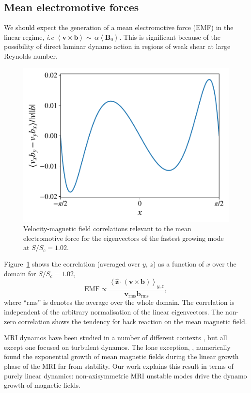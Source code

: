 \documentclass[openacc]{rsproca_new}%
\newcommand{\SSC}{S/S_{c}}
\begin{document}
\subsection{Mean electromotive forces}
\label{sec:emf}
We should expect the generation of a mean electromotive force (EMF) in the linear regime, \textit{i.e}
$\left<\boldsymbol{v}\times\boldsymbol{b}\right>\sim\,\alpha\!\left<\boldsymbol{B}_{0}\right>$.
This is significant because of the possibility of direct laminar dynamo action in regions of weak shear at large Reynolds number.
\begin{figure}[h!]
  \includegraphics[width=\columnwidth]{mean_field_alpha_run_11_output.pdf}
  \caption{Velocity-magnetic field correlations relevant to the mean electromotive force for the eigenvectors of the fastest growing mode at $\SSC = 1.02$.}
  \label{fig:correlation}
\end{figure}
Figure~\ref{fig:correlation} shows the correlation (averaged over $y,\,z$) as a function of $x$ over the domain for $\SSC = 1.02$,
\begin{equation}
\text{EMF}\propto\frac{\left<\boldsymbol{\hat{z}}\cdot(\boldsymbol{v}\times\boldsymbol{b})\right>_{\!y,z}}{\boldsymbol{v}_{\text{rms}}\boldsymbol{b}_{\text{rms}}},
\end{equation}
where ``rms'' is denotes the average over the whole domain. 
The correlation is independent of the arbitrary normalisation of the linear eigenvectors.
The non-zero correlation shows the tendency for back reaction on the mean magnetic field.

MRI dynamos have been studied in a number of different contexts \cite{2007PhRvL..98y4502R,2011ApJ...740...18O,2015PhRvL.114h5002S}, but all except one focused on turbulent dynamos. 
The lone exception, \cite{2016MNRAS.462..818B}, numerically found the exponential growth of mean magnetic fields during the linear growth phase of the MRI far from stability.
Our work explains this result in terms of purely linear dynamics:
non-axisymmetric MRI unstable modes drive the dynamo growth of magnetic fields.
\end{document}
